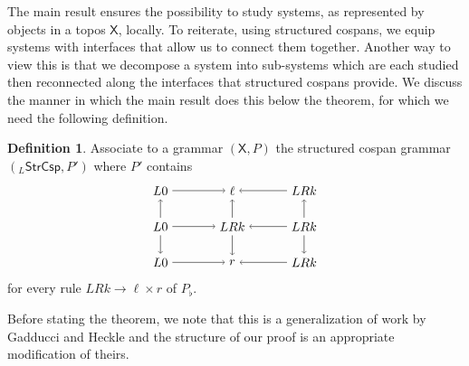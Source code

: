 \documentclass{amsart}
\newcommand{\X}{\cat{X}}
\newcommand{\StrCsp}{\cat{StrCsp}}
\newcommand{\cat}[1]{\mathsf{#1}}
\theoremstyle{remark}
\theoremstyle{definition}
\newtheorem{definition}[theorem]{Definition}
\begin{document}
The main result ensures the possibility to study systems, as
represented by objects in a topos $ \X $, locally. To
reiterate, using structured cospans, we equip systems with
interfaces that allow us to connect them together. Another
way to view this is that we decompose a system into
sub-systems which are each studied then reconnected along
the interfaces that structured cospans provide. We discuss
the manner in which the main result does this below the
theorem, for which we need the following definition.

\begin{definition}
  Associate to a grammar $ ( \X , P ) $ the structured
  cospan grammar $ ( _{L}\StrCsp, P' ) $ where $ P' $
  contains
%
  \[
    \begin{tikzpicture}
      \node (1) at (0,2) {$ L 0 $}; \node (2) at (2,2)
      {$ \ell $}; \node (3) at (4,2) {$ LRk
        $}; \node (4) at (0,1) {$ L 0
        $}; \node (5) at (2,1) {$ LRk
        $}; \node (6) at (4,1) {$ LRk
        $}; \node (7) at (0,0) {$ L 0
        $}; \node (8) at (2,0) {$ r
        $}; \node (9) at (4,0) {$ LRk
        $}; \draw [->] (1) to node [] {\scriptsize{$
          $}} (2); \draw [->] (3) to node []
      {\scriptsize{$
          $}} (2); \draw [->] (4) to node []
      {\scriptsize{$
          $}} (5); \draw [->] (6) to node []
      {\scriptsize{$
          $}} (5); \draw [->] (7) to node []
      {\scriptsize{$
          $}} (8); \draw [->] (9) to node []
      {\scriptsize{$
          $}} (8); \draw [->] (4) to node []
      {\scriptsize{$
          $}} (1); \draw [->] (4) to node []
      {\scriptsize{$
          $}} (7); \draw [->] (5) to node []
      {\scriptsize{$
          $}} (2); \draw [->] (5) to node []
      {\scriptsize{$
          $}} (8); \draw [->] (6) to node []
      {\scriptsize{$
          $}} (3); \draw [->] (6) to node []
      {\scriptsize{$ $}} (9);
    \end{tikzpicture}
  \]
% 
  for every rule $ LRk \to \ell \times r $ of $ P_{\flat} $.
\end{definition}

Before stating the theorem, we note that this is a
generalization of work by Gadducci and Heckle
\cite{Gadd_IndGraphTrans} and the structure of our proof is
an appropriate modification of theirs.
\end{document}
